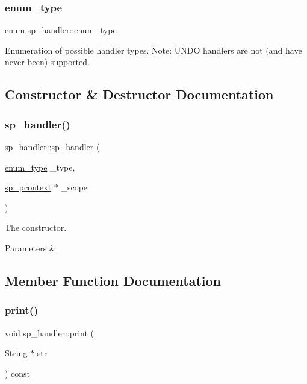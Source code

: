 \subsubsection{\texorpdfstring{enum\+\_\+type}{enum\_type}}
{\footnotesize\ttfamily enum \mbox{\hyperlink{classsp__handler_a702400dd1cd8b2933a38a9e4a5f1eb09}{sp\+\_\+handler\+::enum\+\_\+type}}}

Enumeration of possible handler types. Note\+: U\+N\+DO handlers are not (and have never been) supported. 

\subsection{Constructor \& Destructor Documentation}
\mbox{\label{classsp__handler_a3068e48dec054d1d88566157bd15db28}} 
\subsubsection{\texorpdfstring{sp\+\_\+handler()}{sp\_handler()}}
{\footnotesize\ttfamily sp\+\_\+handler\+::sp\+\_\+handler (\begin{DoxyParamCaption}\item[{\mbox{\hyperlink{classsp__handler_a702400dd1cd8b2933a38a9e4a5f1eb09}{enum\+\_\+type}}}]{\+\_\+type,  }\item[{\mbox{\hyperlink{classsp__pcontext}{sp\+\_\+pcontext}} $\ast$}]{\+\_\+scope }\end{DoxyParamCaption})\hspace{0.3cm}{\ttfamily [inline]}}

The constructor.


\begin{DoxyParams}{Parameters}
{\em } & \\
\hline
\end{DoxyParams}


\subsection{Member Function Documentation}
\mbox{\label{classsp__handler_a8663fc5f5e6c6e8958b5d8de6ced874b}} 
\subsubsection{\texorpdfstring{print()}{print()}}
{\footnotesize\ttfamily void sp\+\_\+handler\+::print (\begin{DoxyParamCaption}\item[{String $\ast$}]{str }\end{DoxyParamCaption}) const}


